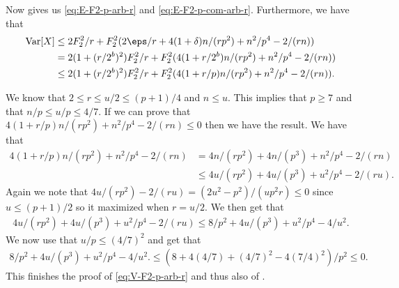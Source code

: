 Now  gives us \eqref{eq:E-F2-p-arb-r} and \eqref{eq:E-F2-p-com-arb-r}.
Furthermore, we have that
\begin{align*}
   \Var[X] & \le 2F_2^2/r + F_2^2 (2\eps/r + 4(1 + \delta)n / (rp^2) + n^2/p^4 - 2 /(rn)) \\  & = 2(1 + (r/2^b)^2)F_2^2/r + F_2^2(4(1 + r/2^b)n/(r p^2) + n^2/p^4 - 2/(rn)) \\  & \le 2(1 + (r/2^b)^2)F_2^2/r + F_2^2(4(1 + r/p)n/(r p^2) + n^2/p^4 - 2/(rn)) .
\end{align*}

We know that $2 \le r \le u/2 \le (p + 1)/4$ and $n \le u$.
This implies that $p \ge 7$ and that $n/p \le u/p \le 4/7$.
If we can prove that $4(1 + r/p)n / (rp^2) + n^2/p^4 - 2 / (rn) \le 0$ then we have the result.
We have that
\begin{align*}
   4(1 + r/p)n / (rp^2) + n^2/p^4 - 2 / (rn) & = 4 n/(rp^2) + 4 n /(p^3) + n^2/p^4 - 2/(rn) \\  & \le 4u/(rp^2) + 4u/(p^3) + u^2/p^4 - 2/(ru) .
\end{align*}
Again we note that $4u/(r p^2) - 2/(ru) = (2u^2 - p^2)/(u p^2 r) \le 0$ since $u \le (p + 1)/2$ so it maximized when $r = u/2$.
We then get that
\begin{align*}
   4u/(r p^2) + 4u/(p^3) + u^2/p^4 - 2/(ru) \le 8/p^2 + 4u/(p^3) + u^2/p^4 - 4/u^2 .
\end{align*}
We now use that $u/p \le (4/7)^2$ and get that
\begin{align*}
   8/p^2 + 4u/(p^3) + u^2/p^4 - 4/u^2 .
   \le (8 + 4 (4/7) + (4/7)^2 - 4 (7/4)^2)/p^2
   \le 0 .
\end{align*}
This finishes the proof of \eqref{eq:V-F2-p-arb-r} and thus also of .

